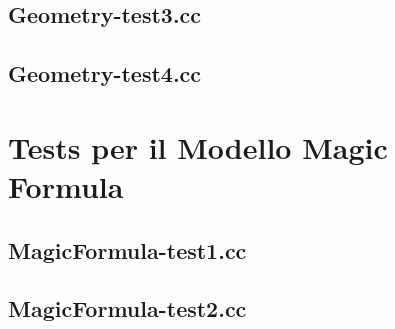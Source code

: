 \subsection{Geometry-test3.cc}
\renewcommand{\baselinestretch}{1.0}

\renewcommand{\baselinestretch}{1.25}
%
\subsection{Geometry-test4.cc}
\renewcommand{\baselinestretch}{1.0}

\renewcommand{\baselinestretch}{1.25}
%
\section{Tests per il Modello Magic Formula}
%
\subsection{MagicFormula-test1.cc}
\renewcommand{\baselinestretch}{1.0}

\renewcommand{\baselinestretch}{1.25}
%
\subsection{MagicFormula-test2.cc}
\renewcommand{\baselinestretch}{1.0}

\renewcommand{\baselinestretch}{1.25}